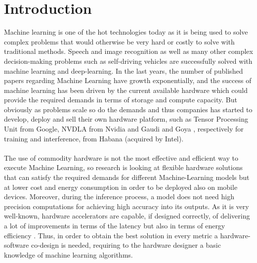 \chapter{Introduction}
Machine learning is one of the hot technologies today as it is being used to solve complex problems that would otherwise be very hard or costly to solve with traditional methods. Speech and image recognition as well as many other complex decision-making problems such as self-driving vehicles are successfully solved with machine learning and deep-learning.
In the last years, the number of published papers regarding Machine Learning have growth exponentially, and the success of machine learning has been driven by the current available hardware which could provide the required demands in terms of storage and compute capacity. But obviously as problems scale so do the demands and thus companies has started to develop, deploy and sell their own hardware platform, such as Tensor Processing Unit \cite{paper:40} from Google, NVDLA\cite{WEBSITE:6} from Nvidia and Gaudi \cite{paper:39} and Goya \cite{paper:38}, respectively for training and interference, from Habana (acquired by Intel). \\\\
The use of commodity hardware is not the most effective and efficient way to execute Machine Learning, so research is looking at flexible hardware solutions \cite{paper:1} \cite{paper:2} that can satisfy the required demands for different Machine-Learning models but at lower cost and energy consumption in order to be deployed also on mobile devices. Moreover, during the inference process, a model does not need high precision computations \cite{paper:8} \cite{paper:15} for achieving high accuracy into its outputs.
As it is very well-known, hardware accelerators are capable, if designed correctly, of delivering a lot of improvements in terms of the latency but also in terms of energy efficiency \cite{paper:29}. Thus, in order to obtain the best solution in every metric a hardware-software co-design is needed, requiring to the hardware designer a basic knowledge of machine learning algorithms.\\\\

